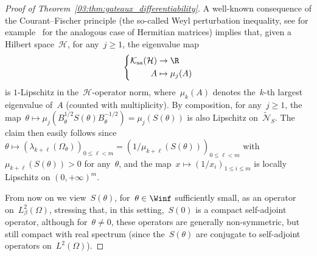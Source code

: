 \begin{proof}[Proof of Theorem~\ref{03:thm:gateaux_differentiability}]
    A well-known consequence of the Courant--Fischer principle (the so-called Weyl perturbation inequality, see for example~\cite[Section 1.3.3]{Ta12} for the analogous case of Hermitian matrices) implies that, given a Hilbert space~$\mathcal H$, for any~$j\geq 1$, the eigenvalue map
    \begin{equation}
        \left\{\begin{aligned} \mathcal K_{\mathrm{sa}}(\mathcal H)&\to \R\\
            A&\mapsto \mu_j(A)\end{aligned}\right.
    \end{equation}
    is $1$-Lipschitz in the~$\mathcal H$-operator norm, where~$\mu_k(A)$ denotes the~$k$-th largest eigenvalue of~$A$ (counted with multiplicity). By composition, for any~$j\geq 1$, the map~$\theta\mapsto \mu_j(B_\theta^{1/2}S(\theta)B_\theta^{-1/2}) = \mu_j(S(\theta))$ is also Lipschitz on~$\widetilde{\mathcal N}_S$.
    The claim then easily follows since~$\theta\mapsto\left(\lambda_{k+\ell}(\Omega_\theta)\right)_{0\leq \ell <m} = \left(1/\mu_{k+\ell}(S(\theta))\right)_{0\leq \ell <m}$ with~$\mu_{k+\ell}(S(\theta))>0$ for any~$\theta$, and the map~$x\mapsto \left(1/x_i\right)_{1\leq i\leq m}$ is locally Lipschitz on $\left(0,+\infty\right)^m$.
    
    From now on we view~$S(\theta)$, for~$\theta\in\Winf$ sufficiently small, as an operator on~$L_\beta^2(\Omega)$, stressing that, in this setting,~$S(0)$ is a compact self-adjoint operator, although for~$\theta\neq 0$, these operators are generally non-symmetric, but still compact with real spectrum (since the~$S(\theta)$ are conjugate to self-adjoint operators on~$L^2(\Omega)$).
    

\end{proof}
